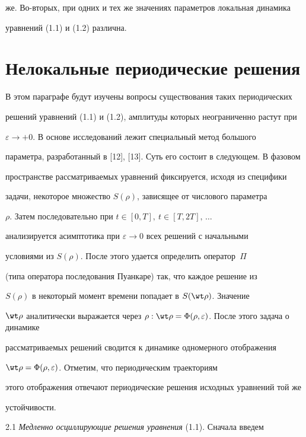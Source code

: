 же. Во-вторых, при одних и тех же значениях параметров локальная динамика


уравнений (1.1) и (1.2) различна.





\section{Нелокальные периодические решения}





В этом параграфе будут изучены вопросы существования таких периодических


решений уравнений (1.1) и (1.2), амплитуды которых неограниченно растут при


$\varepsilon\to +0$. В основе исследований лежит специальный метод большого


параметра, разработанный в [12], [13]. Суть его состоит в следующем. В фазовом


пространстве рассматриваемых уравнений фиксируется, исходя из специфики


задачи, некоторое множество $S(\rho)$, зависящее от числового параметра


$\rho$. Затем последовательно при $t\in[0,T],\ t\in[T,2T],\,\dotsc$


анализируется асимптотика при $\varepsilon\to0$ всех решений с начальными


условиями из $S(\rho)$. После этого удается определить оператор~$\Pi$


(типа оператора последования Пуанкаре) так, что каждое решение из


$S(\rho)$ в некоторый момент времени попадает в $S(\wt\rho)$. Значение


$\wt\rho$ аналитически выражается через $\rho:


\wt\rho=\Phi(\rho,\varepsilon)$. После этого задача о динамике


рассматриваемых решений сводится к динамике одномерного отображения


$\wt\rho=\Phi(\rho,\varepsilon)$. Отметим, что периодическим траекториям


этого отображения отвечают периодические решения исходных уравнений той же


устойчивости.


\medskip





2.1 {\it Медленно осциллирующие решения уравнения} (1.1). Сначала введем


